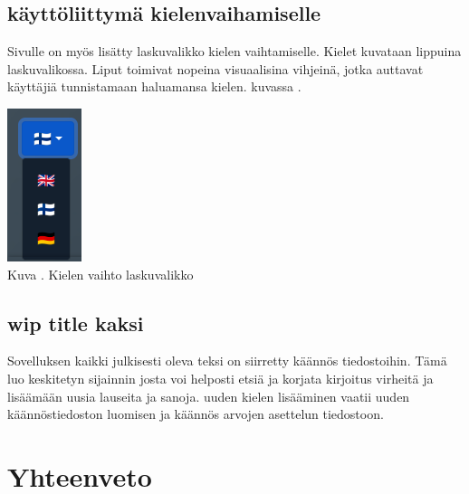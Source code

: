 \documentclass[11pt,a4paper,titlepage,oneside]{article}
\begin{document}
\subsection{käyttöliittymä kielenvaihamiselle}

Sivulle on myös lisätty laskuvalikko kielen vaihtamiselle. 
Kielet kuvataan lippuina laskuvalikossa.
Liput toimivat nopeina visuaalisina vihjeinä, jotka auttavat käyttäjiä tunnistamaan haluamansa kielen.
kuvassa \nextImageCount.



\bigskip
\includegraphics[]{src/public/locale_laskuvalikko.png}\\
Kuva \getImgCount {}. Kielen vaihto laskuvalikko


\subsection{wip title kaksi}
Sovelluksen kaikki julkisesti oleva teksi on siirretty käännös tiedostoihin. 
Tämä luo keskitetyn sijainnin josta voi helposti etsiä ja korjata kirjoitus virheitä ja lisäämään uusia lauseita ja sanoja.
uuden kielen lisääminen vaatii uuden käännöstiedoston luomisen ja käännös arvojen asettelun tiedostoon.
\medskip











\newpage
{} %










\newpage
\section{Yhteenveto}             %
\end{document}
